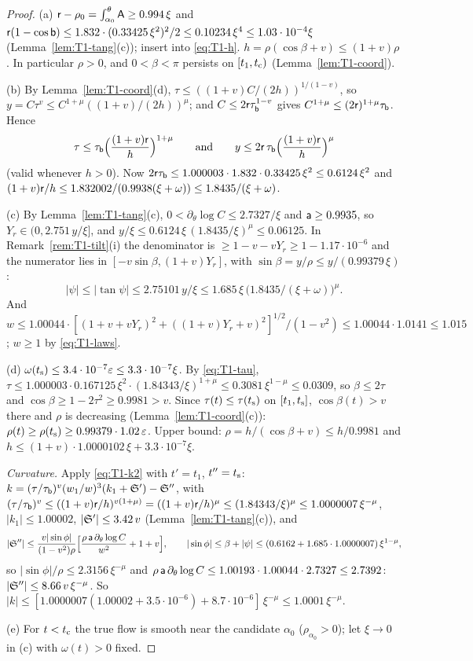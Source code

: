 \begin{proof}
(a) $\mathsf r-\rho_0=\int_{\alpha_0}^\theta\mathsf A\ge0.994\,\xi$ and
$\mathsf r(1-\cos\mathsf b)\le1.832\cdot(0.33425\,\xi^2)^2/2\le0.10234\,\xi^4\le1.03\cdot10^{-4}\xi$ (Lemma~\ref{lem:T1-tang}(c)); insert into
\eqref{eq:T1-h}. $h=\rho(\cos\beta+v)\le(1+v)\rho$. In particular $\rho>0$, and $0<\beta<\pi$ persists on $[t_1,t_{\mathrm c})$
(Lemma~\ref{lem:T1-coord}).

(b) By Lemma~\ref{lem:T1-coord}(d), $\tau\le((1+v)C/(2h))^{1/(1-v)}$, so $y=C\tau^v\le C^{1+\mu}((1+v)/(2h))^\mu$; and
$C\le2\mathsf r\tau_{\mathsf b}^{1-v}$ gives $C^{1+\mu}\le(2\mathsf r)^{1+\mu}\tau_{\mathsf b}$. Hence
\begin{equation}\label{eq:T1-tau}
\tau\le\tau_{\mathsf b}\Bigl(\frac{(1+v)\mathsf r}h\Bigr)^{1+\mu}\qquad\text{and}\qquad y\le2\mathsf r\,\tau_{\mathsf b}\Bigl(\frac{(1+v)\mathsf r}h\Bigr)^{\mu}
\end{equation}
(valid whenever $h>0$). Now $2\mathsf r\tau_{\mathsf b}\le1.000003\cdot1.832\cdot0.33425\,\xi^2\le0.6124\,\xi^2$ and
$(1+v)\mathsf r/h\le1.832002/(0.9938(\xi+\omega))\le1.8435/(\xi+\omega)$.

(c) By Lemma~\ref{lem:T1-tang}(c), $0<\partial_\theta\log C\le2.7327/\xi$ and $\mathsf a\ge0.9935$, so $Y_r\in(0,2.751\,y/\xi]$, and
$y/\xi\le0.6124\,\xi\,(1.8435/\xi)^\mu\le0.06125$. In Remark~\ref{rem:T1-tilt}(i) the denominator is
$\ge1-v-vY_r\ge1-1.17\cdot10^{-6}$ and the numerator lies in $[-v\sin\beta,(1+v)Y_r]$, with $\sin\beta=y/\rho\le y/(0.99379\,\xi)$:
\[
|\psi|\le|\tan\psi|\le2.75101\,y/\xi\le1.685\,\xi\,\bigl(1.8435/(\xi+\omega)\bigr)^\mu .
\]
And $w\le1.00044\cdot[(1+v+vY_r)^2+((1+v)Y_r+v)^2]^{1/2}/(1-v^2)\le1.00044\cdot1.0141\le1.015$; $w\ge1$ by \eqref{eq:T1-laws}.

(d) $\omega(t_{\mathrm s})\le3.4\cdot10^{-7}\varepsilon\le3.3\cdot10^{-7}\xi$. By \eqref{eq:T1-tau},
$\tau\le1.000003\cdot0.167125\,\xi^2\cdot(1.84343/\xi)^{1+\mu}\le0.3081\,\xi^{1-\mu}\le0.0309$, so $\beta\le2\tau$ and
$\cos\beta\ge1-2\tau^2\ge0.9981>v$. Since $\tau(t)\le\tau(t_{\mathrm s})$ on $[t_1,t_{\mathrm s}]$, $\cos\beta(t)>v$ there and $\rho$ is decreasing
(Lemma~\ref{lem:T1-coord}(c)): $\rho(t)\ge\rho(t_{\mathrm s})\ge0.99379\cdot1.02\,\varepsilon$. Upper bound: $\rho=h/(\cos\beta+v)\le h/0.9981$ and
$h\le(1+v)\cdot1.0000102\,\xi+3.3\cdot10^{-7}\xi$.

\emph{Curvature.} Apply \eqref{eq:T1-k2} with $t'=t_1$, $t''=t_{\mathrm s}$:
$k=(\tau/\tau_{\mathsf b})^v(w_1/w)^3(k_1+\mathfrak S')-\mathfrak S''$, with
$(\tau/\tau_{\mathsf b})^v\le((1+v)\mathsf r/h)^{v(1+\mu)}=((1+v)\mathsf r/h)^\mu\le(1.84343/\xi)^\mu\le1.0000007\,\xi^{-\mu}$, $|k_1|\le1.00002$,
$|\mathfrak S'|\le3.42\,v$ (Lemma~\ref{lem:T1-tang}(c)), and
\[
|\mathfrak S''|\le\frac{v|\sin\phi|}{(1-v^2)\rho}\Bigl[\frac{\rho\,\mathsf a\,\partial_\theta\log C}{w^2}+1+v\Bigr],\qquad
|\sin\phi|\le\beta+|\psi|\le(0.6162+1.685\cdot1.0000007)\,\xi^{1-\mu},
\]
so $|\sin\phi|/\rho\le2.3156\,\xi^{-\mu}$ and $\rho\,\mathsf a\,\partial_\theta\log C\le1.00193\cdot1.00044\cdot2.7327\le2.7392$:
$|\mathfrak S''|\le8.66\,v\,\xi^{-\mu}$. So
$|k|\le[1.0000007(1.00002+3.5\cdot10^{-6})+8.7\cdot10^{-6}]\,\xi^{-\mu}\le1.0001\,\xi^{-\mu}$.

(e) For $t<t_{\mathrm c}$ the true flow is smooth near the candidate $\alpha_0$ ($\rho_{\alpha_0}>0$); let $\xi\to0$ in (c) with $\omega(t)>0$
fixed.
\end{proof}

